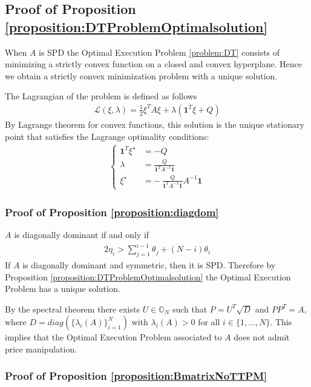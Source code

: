 \documentclass[final,3p,authoryear,12pt]{elsarticle}
\begin{document}
\subsection{Proof of Proposition \ref{proposition:DTProblemOptimalsolution}}

When $A$ is SPD the Optimal Execution Problem \ref{problem:DT} consists of minimizing a strictly convex function on a closed and convex hyperplane. Hence we obtain a strictly convex minimization problem with a unique solution. 

The Lagrangian of the problem is defined as follows
\begin{eqnarray}
\mathcal{L}(\xi,\lambda)= \frac{1}{2}\xi^{T}A\xi + \lambda(\pmb{1}^{T}\xi+Q)
\end{eqnarray}
By Lagrange theorem \cite{boyd_vandenberghe_2004} for convex functions, this solution is the unique stationary point that satisfies the Lagrange optimality conditions:
\begin{align}
    \begin{cases}
    \pmb{1}^{T}\xi^{\star}&=-Q \\
    \lambda &= \frac{Q}{\pmb{1}^{T}A^{-1}\pmb{1}}\\
    \xi^{\star} &= -\,\frac{Q}{\pmb{1}^{T}A^{-1}\pmb{1}} A^{-1}\pmb{1}
    \end{cases}
\end{align}


\subsubsection{Proof of Proposition \ref{proposition:diagdom}}

$A$ is diagonally dominant if and only if \begin{eqnarray}
    2\eta_{i} > \sum_{j=1}^{i-1}\theta_{j}+(N-i)\theta_{i}
\end{eqnarray}
If $A$ is diagonally dominant and symmetric, then it is SPD. Therefore by Proposition \ref{proposition:DTProblemOptimalsolution} the Optimal Execution Problem has a unique solution.

By the spectral theorem there exists $U\in\mathbb{O}_{N}$ such that $P=U^{T}\sqrt{D}$ and $PP^{T}=A$, where $D=diag(\{\lambda_{i}(A)\}_{i=1}^{N})$ with $\lambda_{i}(A)>0$ for all $i\in\{1,\dots,N\}$. This implies that the Optimal Execution Problem associated to $A$ does not admit price manipulation. 

\subsubsection{Proof of Proposition \ref{proposition:BmatrixNoTTPM}}
\end{document}
